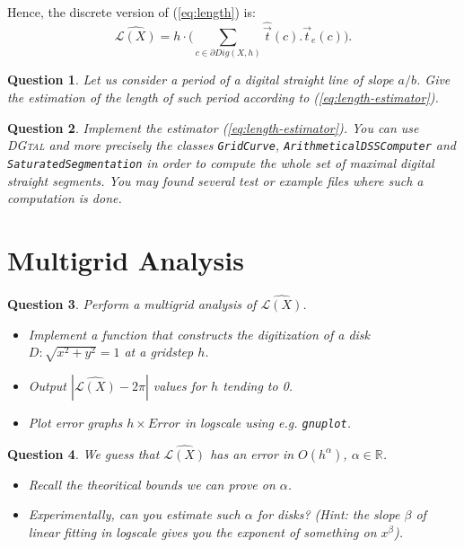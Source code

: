 \documentclass[a4paper, 11pt]{article}
\newtheorem{qu}{Question}
\begin{document}
Hence, the discrete version of (\ref{eq:length}) is:
\begin{equation}
\label{eq:length-estimator}
\hat{\mathcal{L}(X)} = h \cdot \Big( \sum_{c \in \partial Dig(X,h)}  \hat{\vec{t}}(c) . \vec{t}_{e}(c) \Big). 
\end{equation}

\begin{qu}
 Let us consider a period of a digital straight line of slope $a/b$. 
Give the estimation of the length of such period according to (\ref{eq:length-estimator}). 
\end{qu}

\begin{qu}
Implement the estimator (\ref{eq:length-estimator}). You can use \textsc{DGtal} and 
more precisely the classes {\tt GridCurve}, {\tt ArithmeticalDSSComputer} and 
{\tt SaturatedSegmentation} in order to compute the whole set of maximal digital straight 
segments. You may found several test or example files where such a computation is done. 
\end{qu}

\section{Multigrid Analysis}


\begin{qu}
  Perform a multigrid analysis of $\hat{\mathcal{L}(X)}$. 
  \begin{itemize}
  \item Implement a function that constructs the digitization of a disk 
$D: \sqrt{x^2 + y^2} = 1$ at a gridstep $h$.  
  \item Output $| \hat{\mathcal{L}(X)} - 2\pi |$ values for $h$ tending to 0.
  \item Plot error graphs $h \times Error$ in logscale using e.g. \texttt{gnuplot}.
  \end{itemize}	 
\end{qu}	

\begin{qu} 
We guess that $\hat{\mathcal{L}(X)}$ has an error in $O(h^{\alpha})$, $\alpha \in \mathbb{R}$. 
\begin{itemize}
\item Recall the theoritical bounds we can prove on $\alpha$. 
\item Experimentally, can you estimate such $\alpha$ for disks? (Hint: the slope $\beta$ of 
linear fitting in logscale gives you the exponent of something on $x^\beta$). 
\end{itemize}
\end{qu}	
\end{document}
